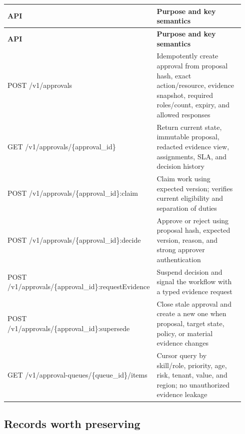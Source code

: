 \BookTableStart
\small
\begin{longtable}{@{}Y{0.4700\linewidth}Y{0.4700\linewidth}@{}}
\color{white}\bfseries \textbf{API} & \color{white}\bfseries \textbf{Purpose and key semantics} \\
\endfirsthead
{}
\color{white}\bfseries \textbf{API} & \color{white}\bfseries \textbf{Purpose and key semantics} \\
\endhead
POST /v1/approvals & Idempotently create approval from proposal hash, exact action/resource, evidence snapshot, required roles/count, expiry, and allowed responses \\
GET /v1/approvals/\{approval\_id\} & Return current state, immutable proposal, redacted evidence view, assignments, SLA, and decision history \\
POST /v1/approvals/\{approval\_id\}:claim & Claim work using expected version; verifies current eligibility and separation of duties \\
POST /v1/approvals/\{approval\_id\}:decide & Approve or reject using proposal hash, expected version, reason, and strong approver authentication \\
POST /v1/approvals/\{approval\_id\}:requestEvidence & Suspend decision and signal the workflow with a typed evidence request \\
POST /v1/approvals/\{approval\_id\}:supersede & Close stale approval and create a new one when proposal, target state, policy, or material evidence changes \\
GET /v1/approval-queues/\{queue\_id\}/items & Cursor query by skill/role, priority, age, risk, tenant, value, and region; no unauthorized evidence leakage \\
\end{longtable}
\BookTableEnd

\subsection{Records worth preserving}

